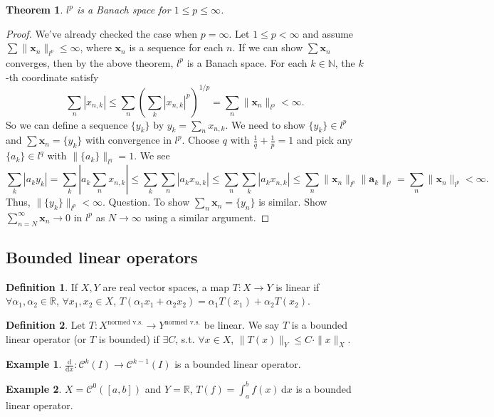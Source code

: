 \documentclass[12pt]{article}
\theoremstyle{plain}
\newtheorem{thm}{Theorem}
\theoremstyle{definition}
\newtheorem*{defn}{Definition}
\newtheorem*{eg}{Example}
\begin{document}
\begin{thm}
    $l^p$ is a Banach space for $1\leq p\leq \infty$.
\end{thm}
\begin{proof}
    We've already checked the case when $p=\infty$.
    Let $1\leq p<\infty$ and assume $\sum \|\bm{x}_n\|_{l^p} \leq \infty$, where $\bm{x}_n$ is a sequence for each $n$.
    If we can show $\sum \bm{x}_n$ converges, then by the above theorem, $l^p$ is a Banach space.
    For each $k\in\mathbb{N}$, the $k$-th coordinate satisfy
    \[
        \sum_n |x_{n,k}| \leq  \sum_n \left(\sum_k |x_{n,k}|^p\right)^{1/p} = \sum_n \|\bm{x}_n\|_{l^p} < \infty.
    \]
    So we can define a sequence $\{y_k\}$ by $y_k = \sum_n x_{n,k}$.
    We need to show $\{y_k\} \in l^p$ and $\sum \bm{x}_n = \{y_k\}$ with
    convergence in $l^p$.
    Choose $q$ with $\frac{1}{q} + \frac{1}{p} = 1$ and pick any $\{a_k\}\in l^q$ with $\|\{a_k\}\|_{l^q} = 1$.
    We see
    \[
        \sum_k |a_ky_k| = \sum_k \left| a_k \sum_n x_{n,k}\right| \leq \sum_k \sum_n |a_k x_{n,k}|
        \leq \sum_n \sum_k |a_k x_{n,k}|
        \leq \sum_n \|\bm{x}_n\|_{l^p}\|\bm{a}_k\|_{l^q}
        = \sum_n \|\bm{x}_n\|_{l^p}
        < \infty.
    \]
    Thus, $\|\{y_k\}\|_{l^p}<\infty$.
    Question.
    To show $\sum_n \bm{x}_n = \{y_n\}$ is similar.
    Show $\sum_{n=N}^\infty \bm{x}_n\rightarrow 0$ in $l^p$ as $N\rightarrow\infty$ using a similar argument.
\end{proof}

\subsection*{Bounded linear operators}
\begin{defn}
    If $X, Y$ are real vector spaces, a map $T: X\rightarrow Y$ is linear if $\forall \alpha_1, \alpha_2\in \mathbb{R}$,
    $\forall x_1, x_2\in X$, $T(\alpha_1 x_1 + \alpha_2 x_2) = \alpha_1 T(x_1) + \alpha_2 T(x_2)$.
\end{defn}

\begin{defn}
    Let $T: X^{\text{normed v.s.}}\rightarrow Y^{\text{normed v.s.}}$ be linear.
    We say $T$ is a bounded linear operator (or $T$ is bounded) if $\exists C$, s.t. $\forall x\in X$,
    $\|T(x)\|_Y\leq C\cdot\|x\|_X.$
\end{defn}

\begin{eg}
    $\frac{\mathrm{d}}{\mathrm{d}x}: \mathcal{C}^k(I) \rightarrow \mathcal{C}^{k-1}(I)$ is a bounded linear operator.
\end{eg}
\begin{eg}
    $X = \mathcal{C}^0([a,b])$ and $Y=\mathbb{R}$, $T(f) = \int_a^b f(x)\,\mathrm{d}x$ is a bounded linear operator.
\end{eg}
\end{document}
